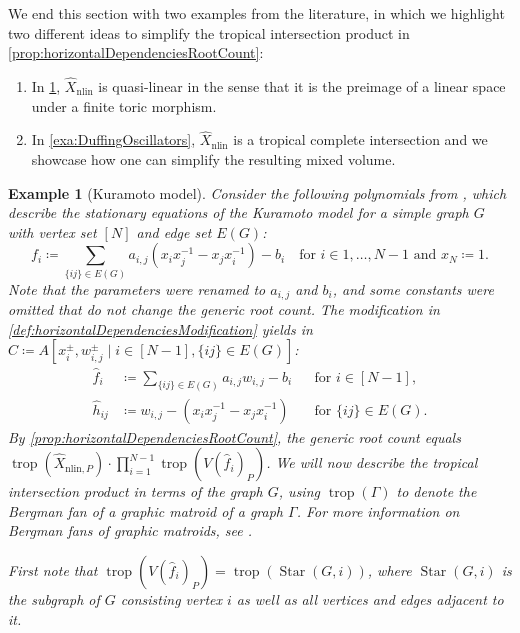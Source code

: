\documentclass[12pt,reqno,a4paper]{amsart}
\theoremstyle{theoremstyle}
\theoremstyle{examplestyle}
\newtheorem{example}[theorem]{Example}
\theoremstyle{algorithmstyle}
\newcommand{\nlin}{{\mathrm{nlin}}}
\DeclareMathOperator{\Star}{Star}
\DeclareMathOperator{\trop}{trop}
\begin{document}
We end this section with two examples from the literature, in which we highlight two different ideas to simplify the tropical intersection product in \cref{prop:horizontalDependenciesRootCount}:
\begin{enumerate}
    \item In \cref{ex:Kuramoto}, $\widehat X_\nlin$ is quasi-linear in the sense that it is the preimage of a linear space under a finite toric morphism.
    \item In \cref{exa:DuffingOscillators}, $\widehat X_\nlin$ is a tropical complete intersection and we showcase how one can simplify the resulting mixed volume.
\end{enumerate}

\begin{example}[Kuramoto model]\label{ex:Kuramoto}
Consider the following polynomials from \cite[Equation F3]{Kuramoto2019}, which describe the stationary equations of the Kuramoto model for a simple graph $G$ with vertex set $[N]$ and edge set $E(G)$:
\begin{equation}\label{eq:Kuramoto}
  f_{i}\coloneqq \sum_{\{ij\}\in E(G)} a_{i,j}(x_{i}x_{j}^{-1}-x_{j}x_{i}^{-1})-b_{i}\quad \text{for } i\in 1,\dots,N-1 \text{ and } x_N\coloneqq 1.
\end{equation}
Note that the parameters were renamed to $a_{i,j}$ and $b_i$, and some constants were omitted that do not change the generic root count.  The modification in \cref{def:horizontalDependenciesModification} yields in $\widehat C \coloneqq A[x_i^\pm, w_{i,j}^\pm \mid i\in [N-1], \{ij\}\in E(G)]$:
\allowdisplaybreaks
  \begin{align*}
    \hat{f}_{i}&\coloneqq\sum_{\{ij\}\in E(G)} a_{i,j}w_{i,j}-b_i &&\text{for } i\in [N-1],\\
    \hat{h}_{ij}&\coloneqq w_{i,j}-(x_{i}x_{j}^{-1}-x_{j}x_{i}^{-1}) &&\text{for }\{ij\}\in E(G).
  \end{align*}
  By \cref{prop:horizontalDependenciesRootCount}, the generic root count equals $\trop(\widehat X_{\nlin,P})\cdot \prod_{i=1}^{N-1} \trop(V(\widehat{f}_{i})_{P})$.  We will now describe the tropical intersection product in terms of the graph $G$, using $\trop(\Gamma)$ to denote the Bergman fan of a graphic matroid of a graph $\Gamma$.  For more information on Bergman fans of graphic matroids, see \cite[Example 4.2.14]{MS15}.

  First note that $\trop(V(\widehat{f}_{i})_{P}) = \trop(\Star(G,i))$, where $\Star(G,i)$ is the subgraph of $G$ consisting vertex $i$ as well as all vertices and edges adjacent to it.


\end{example}
\end{document}
